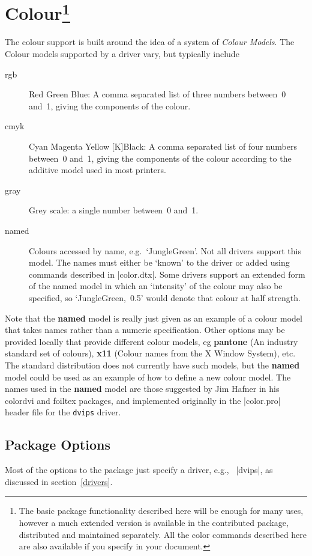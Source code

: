 \section[Colour]{Colour\footnote{%
The basic  package functionality described here
will be enough for many uses, however a much extended version
is available in the contributed  package, distributed
and maintained separately. All the color commands described here are
also available if you specify  in your document.}%
}
The colour support is built around the idea of a system of
\emph{Colour Models}. The Colour models supported by a driver vary,
but typically include
\begin{description}
\item[rgb] Red Green Blue: A comma separated list of three numbers
  between~0 and~1, giving the components of the colour.
\item[cmyk] Cyan Magenta Yellow [K]Black:  A comma separated list of
  four numbers between~0 and~1, giving the components of the colour
  according to the additive model used in most printers.
\item[gray] Grey scale: a single number between~0 and~1.
\item[named] Colours accessed by name, e.g.\ `JungleGreen'. Not all
  drivers support this model. The names must either be `known' to the
  driver or added using commands described in |color.dtx|. Some drivers
  support an extended form of the named model in which an `intensity' of
  the colour may also be specified, so `\mbox{JungleGreen, 0.5}' would
  denote that colour at half strength.
\end{description}
Note that the \textbf{named} model is really just given as an example
of a colour model that takes names rather than a numeric specification.
Other options may be provided locally that provide different colour
models, eg \textbf{pantone} (An industry standard set of colours),
\textbf{x11} (Colour names from the X Window System), etc. The
standard distribution does not currently have such models, but the
\textbf{named} model could be used as an example of how to define a new
colour model. The names used in the \textbf{named} model are those 
suggested by Jim Hafner in his \textsf{colordvi} and \textsf{foiltex}
packages, and implemented originally in the |color.pro| header file for
the \texttt{dvips} driver.

\subsection{Package Options}
Most of the options to the  package just specify a
driver, e.g., \ |dvips|, as discussed in section~\ref{drivers}.

